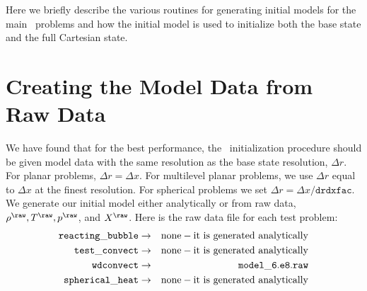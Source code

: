 Here we briefly describe the various routines for generating initial models
for the main \maestro\ problems and how the initial model is used to initialize
both the base state and the full Cartesian state.


\section{Creating the Model Data from Raw Data}\label{Sec:Creating the Model Data from Raw Data}
\label{sec:initial_models_main}

We have found that for the best performance, the \maestro\
initialization procedure should be given model data with the same
resolution as the base state resolution, $\Delta r$.  For planar
problems, $\Delta r = \Delta x$.  For multilevel planar problems, we
use $\Delta r$ equal to $\Delta x$ at the finest resolution.  For
spherical problems we set $\Delta r = \Delta x/\mathtt{drdxfac}$.  We
generate our initial model either analytically or from raw data,
$\rho^{\raw}, T^{\raw}, p^{\raw}$, and $X^{\raw}$.  Here is the raw
data file for each test problem:
\begin{eqnarray}
{\tt reacting\_bubble} & \rightarrow & \mathrm{none-it~ is~ generated~ analytically} \nonumber \nonumber \\
{\tt test\_convect} & \rightarrow & \mathrm{none-it~ is~ generated~ analytically} \nonumber \nonumber \\
{\tt wdconvect} & \rightarrow & {\tt model\_6.e8.raw} \nonumber \\
{\tt spherical\_heat} & \rightarrow & \mathrm{none-it~ is~ generated~ analytically} \nonumber \\
\end{eqnarray}

